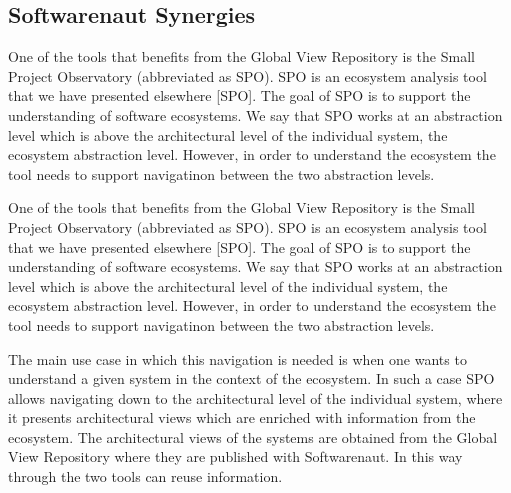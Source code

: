 \documentclass[preprint,12pt]{elsarticle}
\begin{document}
\subsection {Softwarenaut Synergies}
One of the tools that benefits from the Global View Repository is the Small Project Observatory (abbreviated as SPO). SPO is an ecosystem analysis tool that we have presented elsewhere [SPO]. The goal of SPO is to support the understanding of software ecosystems. We say that SPO works at an abstraction level which is above the architectural level of the individual system, the ecosystem abstraction level. However, in order to understand the  ecosystem the tool needs to support navigatinon between the two abstraction levels. 

One of the tools that benefits from the Global View Repository is the Small Project Observatory (abbreviated as SPO). SPO is an ecosystem analysis tool that we have presented elsewhere [SPO]. The goal of SPO is to support the understanding of software ecosystems. We say that SPO works at an abstraction level which is above the architectural level of the individual system, the ecosystem abstraction level. However, in order to understand the  ecosystem the tool needs to support navigatinon between the two abstraction levels. 


The main use case in which this navigation is needed is when one wants to understand a given system in the context of the ecosystem. In such a case SPO allows navigating down to the architectural level of the individual system, where it presents architectural views which are enriched with information from the ecosystem. The architectural views of the systems are obtained from the Global View Repository where they are published with Softwarenaut. In this way through the two tools can reuse information.
\end{document}
